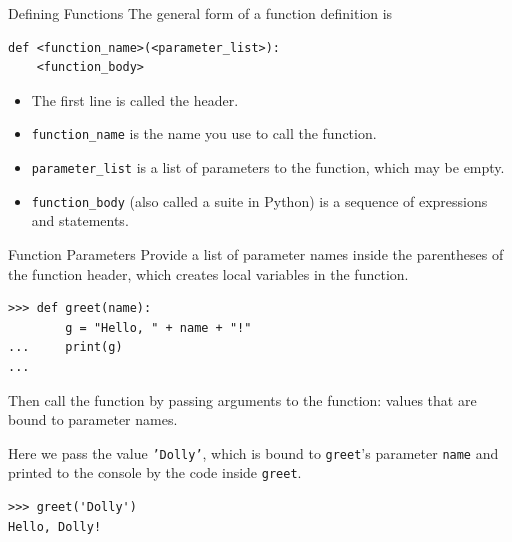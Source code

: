 \documentclass[smaller, aspectratio=1610]{beamer}
\begin{document}
\begin{frame}[label={sec:orge98bcaa},fragile]{Defining Functions}
 The general form of a function definition is

\lstset{language=Python,label= ,caption= ,captionpos=b,numbers=none}
\begin{lstlisting}
def <function_name>(<parameter_list>):
    <function_body>
\end{lstlisting}

\begin{itemize}
\item The first line is called the header.
\item \texttt{function\_name} is the name you use to call the function.
\item \texttt{parameter\_list} is a list of parameters to the function, which may be empty.
\item \texttt{function\_body} (also called a suite in Python) is a sequence of expressions and statements.
\end{itemize}
\end{frame}

\begin{frame}[label={sec:orged55302},fragile]{Function Parameters}
 Provide a list of parameter names inside the parentheses of the function header, which creates local variables in the function.

\lstset{language=Python,label= ,caption= ,captionpos=b,numbers=none}
\begin{lstlisting}
>>> def greet(name):
        g = "Hello, " + name + "!"
...     print(g)
...
\end{lstlisting}

Then call the function by passing \alert{arguments} to the function: values that are bound to parameter names.

Here we pass the value \texttt{'Dolly'}, which is bound to \texttt{greet}'s parameter \texttt{name} and printed to the console by the code inside \texttt{greet}.

\lstset{language=Python,label= ,caption= ,captionpos=b,numbers=none}
\begin{lstlisting}
>>> greet('Dolly')
Hello, Dolly!
\end{lstlisting}
\end{frame}
\end{document}

